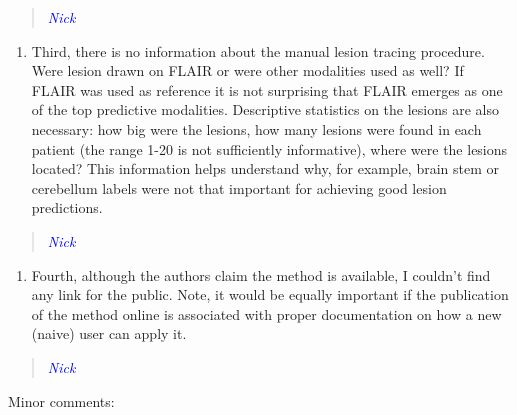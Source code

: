 \documentclass[12pt,]{article}
\providecommand{\tightlist}{%
  \setlength{\itemsep}{0pt}\setlength{\parskip}{0pt}}
\begin{document}
\begin{quote}
\emph{\textcolor{blue}{Nick}}
\end{quote}

\begin{enumerate}
\def\labelenumi{\arabic{enumi}.}
\setcounter{enumi}{2}
\tightlist
\item
  Third, there is no information about the manual lesion tracing
  procedure. Were lesion drawn on FLAIR or were other modalities used as
  well? If FLAIR was used as reference it is not surprising that FLAIR
  emerges as one of the top predictive modalities. Descriptive
  statistics on the lesions are also necessary: how big were the
  lesions, how many lesions were found in each patient (the range 1-20
  is not sufficiently informative), where were the lesions located? This
  information helps understand why, for example, brain stem or
  cerebellum labels were not that important for achieving good lesion
  predictions.
\end{enumerate}

\begin{quote}
\emph{\textcolor{blue}{Nick}}
\end{quote}

\begin{enumerate}
\def\labelenumi{\arabic{enumi}.}
\setcounter{enumi}{3}
\tightlist
\item
  Fourth, although the authors claim the method is available, I couldn't
  find any link for the public. Note, it would be equally important if
  the publication of the method online is associated with proper
  documentation on how a new (naive) user can apply it.
\end{enumerate}

\begin{quote}
\emph{\textcolor{blue}{Nick}}
\end{quote}

Minor comments:
\end{document}
